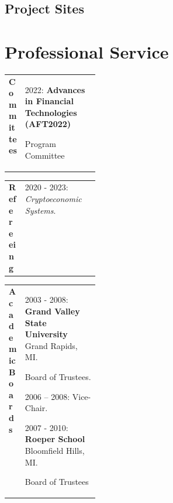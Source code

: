 \documentclass[11pt]{article}
\makeatletter
\newcommand{\cventry}[2]{%
  \begin{tabularx}{\linewidth}{@{}p{0.18\linewidth} X@{}}
    \textbf{#1} & #2
  \end{tabularx}\par
}
\makeatother
\begin{document}
\subsection{Project Sites}
\printbibliography[filter=projects, heading=none]






\section*{Professional Service}
\cventry{Committees}{2022: \textbf{Advances in Financial Technologies (AFT2022)}

Program Committee}

\cventry{Refereeing}{2020 - 2023: \textit{Cryptoeconomic Systems}.}
\cventry{Academic Boards}{2003 - 2008: \textbf{Grand Valley State University} Grand Rapids, MI.

Board of Trustees. 

2006 -- 2008: Vice-Chair.

2007 - 2010: \textbf{Roeper School} Bloomfield Hills, MI.

Board of Trustees}



\end{document}
